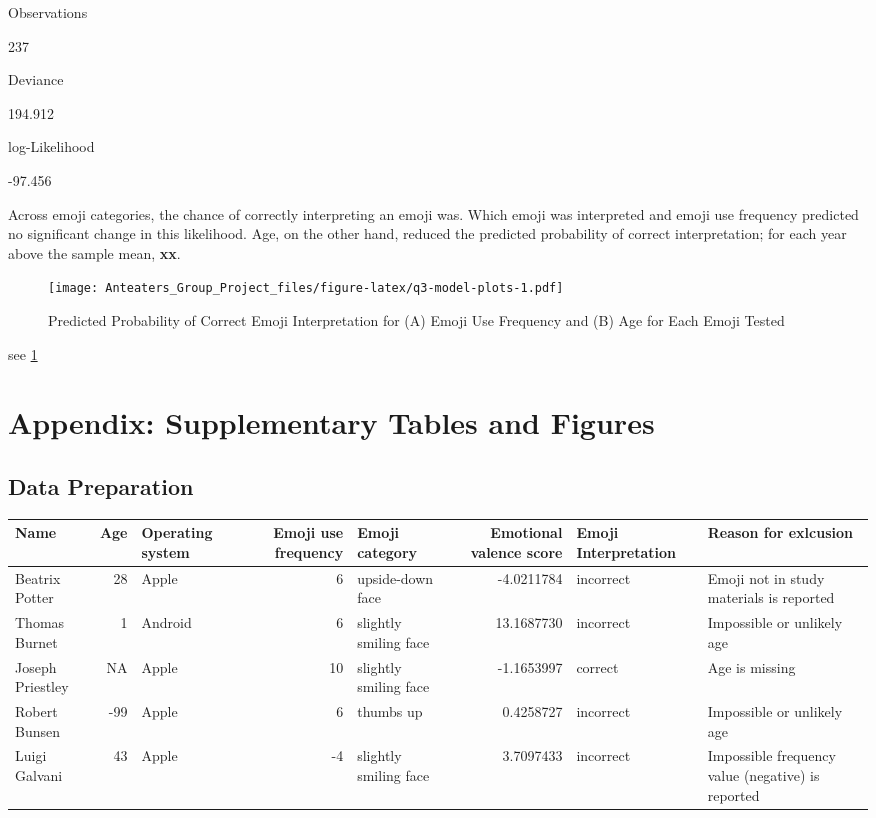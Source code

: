 \documentclass[
]{article}
\begin{document}
Observations

237

Deviance

194.912

log-Likelihood

-97.456

Across emoji categories, the chance of correctly interpreting an emoji was. Which emoji was interpreted and emoji use frequency predicted no significant change in this likelihood. Age, on the other hand, reduced the predicted probability of correct interpretation; for each year above the sample mean, \textbf{xx}.

\begin{figure}
\centering
\texttt{[image: Anteaters\_Group\_Project\_files/figure-latex/q3-model-plots-1.pdf]}
\caption{\label{fig:q3-model-plots}Predicted Probability of Correct Emoji Interpretation for (A) Emoji Use Frequency and (B) Age for Each Emoji Tested}
\end{figure}

see \ref{fig:q3-model-plots}

\hypertarget{appendix-supplementary-tables-and-figures}{%
\section{Appendix: Supplementary Tables and Figures}\label{appendix-supplementary-tables-and-figures}}

\hypertarget{data-preparation-1}{%
\subsection{Data Preparation}\label{data-preparation-1}}

\begin{table}
\centering
\begin{tabular}{l|r|l|r|l|r|l|l}
\hline
Name & Age & Operating system & Emoji use frequency & Emoji category & Emotional valence score & Emoji Interpretation & Reason for exlcusion\\
\hline
Beatrix Potter & 28 & Apple & 6 & upside-down face & -4.0211784 & incorrect & Emoji not in study materials is reported\\
\hline
Thomas Burnet & 1 & Android & 6 & slightly smiling face & 13.1687730 & incorrect & Impossible or unlikely age\\
\hline
Joseph Priestley & NA & Apple & 10 & slightly smiling face & -1.1653997 & correct & Age is missing\\
\hline
Robert Bunsen & -99 & Apple & 6 & thumbs up & 0.4258727 & incorrect & Impossible or unlikely age\\
\hline
Luigi Galvani & 43 & Apple & -4 & slightly smiling face & 3.7097433 & incorrect & Impossible frequency value (negative) is reported\\
\hline
\end{tabular}
\end{table}
\end{document}
